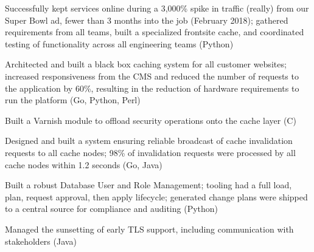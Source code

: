 %
\item Successfully kept services online during a 3,000\% spike in traffic (really) from our Super Bowl ad, fewer than 3
  months into the job (February 2018); gathered requirements from all teams, built a specialized frontsite cache, and
  coordinated testing of functionality across all engineering teams (Python)

\item Architected and built a black box caching system for all customer websites; increased responsiveness from the CMS
  and reduced the number of requests to the application by 60\%, resulting in the reduction of hardware requirements to
  run the platform (Go, Python, Perl)

\item Built a Varnish module to offload security operations onto the cache layer (C)

\item Designed and built a system ensuring reliable broadcast of cache invalidation requests to all cache nodes; 98\% of
  invalidation requests were processed by all cache nodes within 1.2 seconds (Go, Java)

\item Built a robust Database User and Role Management; tooling had a full load, plan, request approval, then apply
  lifecycle; generated change plans were shipped to a central source for compliance and auditing (Python)

\item Managed the sunsetting of early TLS support, including communication with stakeholders (Java)
